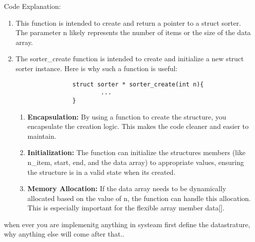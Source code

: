 Code Explanation:
\begin{enumerate}

        \item This function is intended to create and return a pointer to a struct sorter.
        The parameter n likely represents the number of items or the size of the data array.

        \item The sorter\_create function is intended to create and initialize a new struct sorter instance.
        Here is why such a function is useful:

        \begin{verbatim}
                struct sorter * sorter_create(int n){
                        ...
                }
        \end{verbatim}

        \begin{enumerate}
        \item \textbf{Encapsulation: } By using a function to create the structure, you encapsulate the creation logic. This makes the code cleaner and easier to maintain.
        \item \textbf{Initialization: } The function can initialize the structure\textquotesingle s members (like n\_item, start, end, and the data array)
         to appropriate values, ensuring the structure is in a valid state when it\textquotesingle s created.
        \item \textbf{Memory Allocation: } If the data array needs to be dynamically allocated based on the value of n, the function can handle this allocation. This is especially important for the flexible array member data[].
        \end{enumerate}

    
        


\end{enumerate}

when ever you are implemenitg anything in systeam first define the datastrature, why anything else will come after that..

